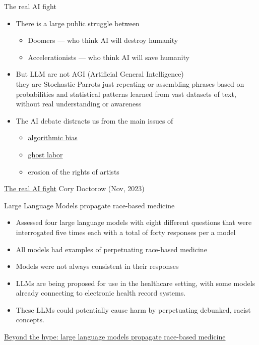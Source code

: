 \begin{frame}{The real AI fight}

\begin{itemize}
\item There is a large public struggle between
  \begin{itemize}
  \item Doomers --- who think AI will destroy humanity
  \item Accelerationists --- who think AI will save humanity
  \end{itemize}
\item But LLM are not AGI (Artificial General Intelligence)
  \\ they are Stochastic Parrots just repeating or assembling phrases based on probabilities and statistical patterns learned from vast datasets of text, without real understanding or awareness \citep{10.1145/3442188.3445922}
\item The AI debate distracts us from the main issues of
  \begin{itemize}
  \item \href{https://en.wikipedia.org/wiki/Algorithmic_bias}{algorithmic bias}
  \item \href{https://en.wikipedia.org/wiki/Ghost_work}{ghost labor}
  \item erosion of the rights of artists
  \end{itemize}
\end{itemize}
\href{https://pluralistic.net/2023/11/27/10-types-of-people/}{The real AI fight} Cory Doctorow (Nov, 2023)

\end{frame}

\begin{frame}{Large Language Models propagate race-based medicine}

\begin{itemize}
\item Assessed four large language models with eight different questions that were
interrogated five times each with a total of forty responses per a model
\item All models had examples
of perpetuating race-based medicine
\item Models were not always consistent in
their responses 
\item  LLMs are being proposed for use in the healthcare setting, with
some models already connecting to electronic health record systems. 
\item These LLMs could potentially cause harm by perpetuating debunked,
racist concepts. 
\end{itemize}
\href{https://doi.org/10.1101/2023.07.03.23292192}{Beyond the hype: large language models propagate race-based medicine }
\end{frame}

